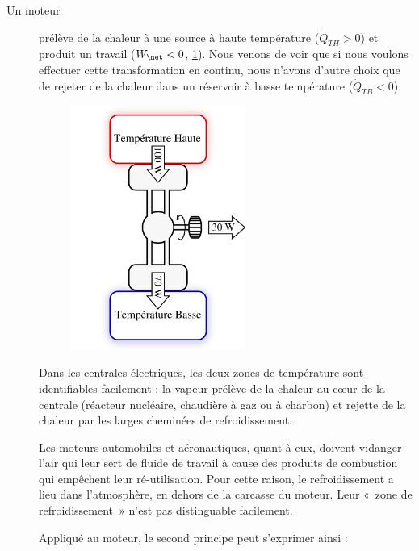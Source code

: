 		\begin{description}

			\item[Un moteur]{prélève de la chaleur à une source à haute température ($\dot Q_{TH} > 0$) et produit un travail ($\dot W_\net < 0$, \cref{fig_moteur_exemple_valeurs}). Nous venons de voir que si nous voulons effectuer cette transformation en continu, nous n’avons d’autre choix que de rejeter de la chaleur dans un réservoir à basse température ($\dot Q_{TB} < 0$).

			\begin{figure}
				\begin{center}
					\includegraphics[height=8cm]{images/exemple_moteur.png}
				\end{center}
				\label{fig_moteur_exemple_valeurs}
			\end{figure}

			Dans les centrales électriques, les deux zones de température sont identifiables facilement : la vapeur prélève de la chaleur au cœur de la centrale (réacteur nucléaire, chaudière à gaz ou à charbon) et rejette de la chaleur par les larges cheminées de refroidissement.

			Les moteurs automobiles et aéronautiques, quant à eux, doivent vidanger l’air qui leur sert de fluide de travail à cause des produits de combustion qui empêchent leur ré-utilisation. Pour cette raison, le refroidissement a lieu dans l’atmosphère, en dehors de la carcasse du moteur. Leur «~zone de refroidissement~» n’est pas distinguable facilement.

			Appliqué au moteur, le second principe peut s’exprimer ainsi :

}
\end{description}
